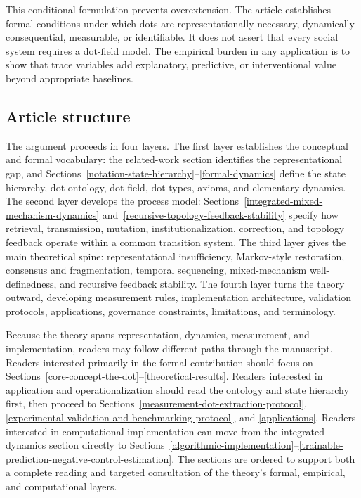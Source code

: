 \documentclass[11pt]{article}
\theoremstyle{remark}
\begin{document}
This conditional formulation prevents overextension. The article establishes formal conditions under which dots are representationally necessary, dynamically consequential, measurable, or identifiable. It does not assert that every social system requires a dot-field model. The empirical burden in any application is to show that trace variables add explanatory, predictive, or interventional value beyond appropriate baselines.

\subsection{Article structure}\label{article-structure}

The argument proceeds in four layers. The first layer establishes the conceptual and formal vocabulary: the related-work section identifies the representational gap, and Sections~\ref{notation-state-hierarchy}--\ref{formal-dynamics} define the state hierarchy, dot ontology, dot field, dot types, axioms, and elementary dynamics. The second layer develops the process model: Sections~\ref{integrated-mixed-mechanism-dynamics} and~\ref{recursive-topology-feedback-stability} specify how retrieval, transmission, mutation, institutionalization, correction, and topology feedback operate within a common transition system. The third layer gives the main theoretical spine: representational insufficiency, Markov-style restoration, consensus and fragmentation, temporal sequencing, mixed-mechanism well-definedness, and recursive feedback stability. The fourth layer turns the theory outward, developing measurement rules, implementation architecture, validation protocols, applications, governance constraints, limitations, and terminology.

Because the theory spans representation, dynamics, measurement, and implementation, readers may follow different paths through the manuscript. Readers interested primarily in the formal contribution should focus on Sections~\ref{core-concept-the-dot}--\ref{theoretical-results}. Readers interested in application and operationalization should read the ontology and state hierarchy first, then proceed to Sections~\ref{measurement-dot-extraction-protocol}, \ref{experimental-validation-and-benchmarking-protocol}, and \ref{applications}. Readers interested in computational implementation can move from the integrated dynamics section directly to Sections~\ref{algorithmic-implementation}--\ref{trainable-prediction-negative-control-estimation}. The sections are ordered to support both a complete reading and targeted consultation of the theory's formal, empirical, and computational layers.
\end{document}
